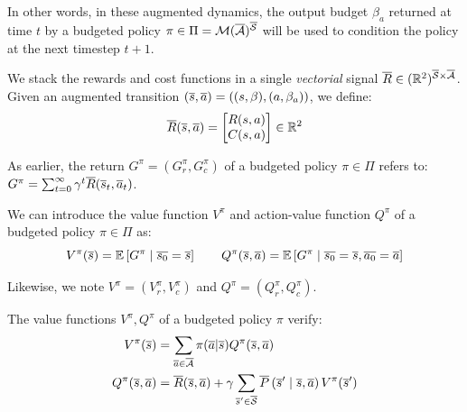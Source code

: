 \documentclass{article}
\begin{document}
In other words, in these augmented dynamics, the output budget $\beta_a$ returned at time $t$ by a budgeted policy $\pi\in \Pi=\mathcal{M}(\overline{\mathcal{A}})^{\overline{\mathcal{S}}}$ will be used to condition the policy at the next timestep $t+1$.

We stack the rewards and cost functions in a single \emph{vectorial} signal $\overline{R} \in (\mathbb{R}^2)^{{\overline{\mathcal{S}} \times \overline{\mathcal{A}}}}$.
Given an augmented transition $(\overline{s}, \overline{a}) =((s,\beta), (a, \beta_a))$, we define:
\begin{equation}
     \overline{R}(\overline{s}, \overline{a}) =  \begin{bmatrix}
     R(s, a)\\
     C(s, a)
     \end{bmatrix}\in\mathbb{R}^2
\end{equation}


As earlier, the return $G^\pi = (G_r^\pi, G_c^\pi)$ of a budgeted policy $\pi\in\Pi$ refers to:
    $G^\pi = \sum_{t=0}^\infty \gamma^t \overline{R}(\overline{s}_t, \overline{a}_t)$.

We can introduce the value function $V^\pi$ and action-value function $Q^\pi$ of a budgeted policy $\pi\in\Pi$ as:
\begin{equation}
    \label{eq:value-function}
V^\pi(\overline{s}) = \operatorname*{\mathbb{E}}\left[ G^\pi \;\middle|\; \overline{s_0} = \overline{s}\right] \qquad Q^\pi(\overline{s}, \overline{a}) = \operatorname*{\mathbb{E}}\left[ G^\pi \;\middle|\; \overline{s_0} = \overline{s}, \overline{a_0} = \overline{a}\right]
\end{equation}

Likewise, we note $V^\pi = (V_r^\pi, V_c^\pi)$ and $Q^\pi = (Q_r^\pi, Q_c^\pi)$.

\begin{proposition}
\label{prop:bellman-expectation}
The value functions $V^\pi, Q^\pi$ of a budgeted policy $\pi$ verify:
\begin{align}
    V^\pi(\overline{s}) &= \sum_{\overline{a}\in\overline{\mathcal{A}}}\pi(\overline{a} | \overline{s}) Q^\pi(\overline{s}, \overline{a})\\
    Q^\pi(\overline{s}, \overline{a}) &= \overline{R}(\overline{s}, \overline{a}) + \gamma\sum_{\overline{s}'\in\overline{\mathcal{S}}}\overline{P}\left(\overline{s}' \;\middle|\; \overline{s}, \overline{a}\right) V^\pi(\overline{s}') \label{eq:bellman_expectation_Q}
\end{align}
\end{proposition}
\end{document}
